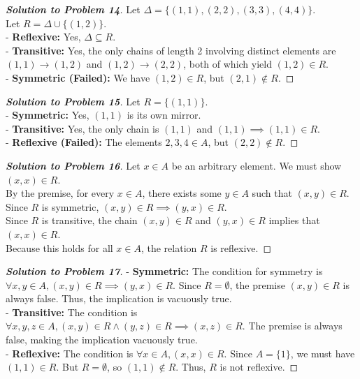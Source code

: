 \documentclass[11pt, a4paper]{article}
\theoremstyle{definition}
\theoremstyle{remark}
\begin{document}
\begin{proof}[\textbf{Solution to Problem 14}]
Let $\Delta = \{(1,1), (2,2), (3,3), (4,4)\}$. \\
Let $R = \Delta \cup \{(1, 2)\}$. \\
- \textbf{Reflexive:} Yes, $\Delta \subseteq R$. \\
- \textbf{Transitive:} Yes, the only chains of length 2 involving distinct elements are $(1,1) \to (1,2)$ and $(1,2) \to (2,2)$, both of which yield $(1,2) \in R$. \\
- \textbf{Symmetric (Failed):} We have $(1, 2) \in R$, but $(2, 1) \notin R$.
\end{proof}

\begin{proof}[\textbf{Solution to Problem 15}]
Let $R = \{(1, 1)\}$. \\
- \textbf{Symmetric:} Yes, $(1, 1)$ is its own mirror. \\
- \textbf{Transitive:} Yes, the only chain is $(1, 1)$ and $(1, 1) \implies (1, 1) \in R$. \\
- \textbf{Reflexive (Failed):} The elements $2, 3, 4 \in A$, but $(2, 2) \notin R$.
\end{proof}

\begin{proof}[\textbf{Solution to Problem 16}]
Let $x \in A$ be an arbitrary element. We must show $(x, x) \in R$. \\
By the premise, for every $x \in A$, there exists some $y \in A$ such that $(x, y) \in R$. \\
Since $R$ is symmetric, $(x, y) \in R \implies (y, x) \in R$. \\
Since $R$ is transitive, the chain $(x, y) \in R$ and $(y, x) \in R$ implies that $(x, x) \in R$. \\
Because this holds for all $x \in A$, the relation $R$ is reflexive.
\end{proof}

\begin{proof}[\textbf{Solution to Problem 17}]
- \textbf{Symmetric:} The condition for symmetry is $\forall x, y \in A, (x, y) \in R \implies (y, x) \in R$. Since $R = \emptyset$, the premise $(x, y) \in R$ is always false. Thus, the implication is vacuously true. \\
- \textbf{Transitive:} The condition is $\forall x, y, z \in A, (x, y) \in R \land (y, z) \in R \implies (x, z) \in R$. The premise is always false, making the implication vacuously true. \\
- \textbf{Reflexive:} The condition is $\forall x \in A, (x, x) \in R$. Since $A = \{1\}$, we must have $(1, 1) \in R$. But $R = \emptyset$, so $(1, 1) \notin R$. Thus, $R$ is not reflexive.
\end{proof}
\end{document}

